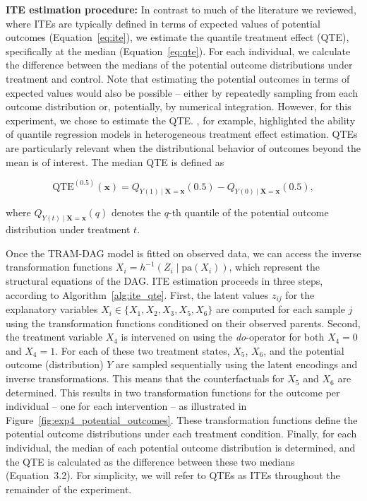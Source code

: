 \textbf{ITE estimation procedure:} \label{qte:exp4} In contrast to much of the literature we reviewed, where ITEs are typically defined in terms of expected values of potential outcomes (Equation~\ref{eq:ite}), we estimate the quantile treatment effect (QTE), specifically at the median (Equation~\ref{eq:qte}). For each individual, we calculate the difference between the medians of the potential outcome distributions under treatment and control. Note that estimating the potential outcomes in terms of expected values would also be possible -- either by repeatedly sampling from each outcome distribution or, potentially, by numerical integration. However, for this experiment, we chose to estimate the QTE. 
\citet{chernozhukov2005}, for example, highlighted the ability of quantile regression models in heterogeneous treatment effect estimation. QTEs are particularly relevant when the distributional behavior of outcomes beyond the mean is of interest. The median QTE is defined as

\begin{equation}
\text{QTE}^{(0.5)}(\mathbf{x}) = Q_{Y(1) \mid \mathbf{X} = \mathbf{x}}(0.5) - Q_{Y(0) \mid \mathbf{X} = \mathbf{x}}(0.5),
\label{eq:qte}
\end{equation}


where $Q_{Y(t) \mid \mathbf{X} = \mathbf{x}}(q)$ denotes the $q$-th quantile of the potential outcome distribution under treatment $t$.

Once the TRAM-DAG model is fitted on observed data, we can access the inverse transformation functions $X_i = h^{-1}(Z_i \mid \text{pa}(X_i))$, which represent the structural equations of the DAG. ITE estimation proceeds in three steps, according to Algorithm~\ref{alg:ite_qte}. First, the latent values $z_{ij}$ for the explanatory variables $X_i \in \{X_1, X_2, X_3, X_5, X_6\}$ are computed for each sample $j$ using the transformation functions conditioned on their observed parents. Second, the treatment variable $X_4$ is intervened on using the \textit{do}-operator for both $X_4 = 0$ and $X_4 = 1$. For each of these two treatment states, $X_5$, $X_6$, and the potential outcome (distribution) $Y$ are sampled sequentially using the latent encodings and inverse transformations. This means that the counterfactuals for $X_5$ and $X_6$ are determined. This results in two transformation functions for the outcome per individual -- one for each intervention -- as illustrated in Figure~\ref{fig:exp4_potential_outcomes}. These transformation functions define the potential outcome distributions under each treatment condition. Finally, for each individual, the median of each potential outcome distribution is determined, and the QTE is calculated as the difference between these two medians (Equation~3.2). For simplicity, we will refer to QTEs as ITEs throughout the remainder of the experiment.


